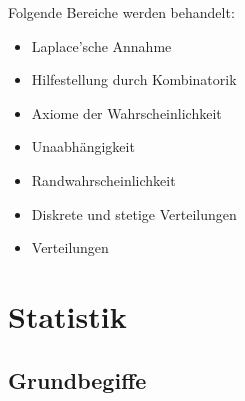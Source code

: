 \documentclass[12pt]{scrartcl}
\begin{document}
Folgende Bereiche werden behandelt:
\begin{itemize}
    \item Laplace'sche Annahme
    \item Hilfestellung durch Kombinatorik
    \item Axiome der Wahrscheinlichkeit
    \item Unaabhängigkeit
    \item Randwahrscheinlichkeit
    \item Diskrete und stetige Verteilungen
    \item Verteilungen
\end{itemize}

\pagebreak

\section{Statistik}

\subsection{Grundbegiffe}
\end{document}
